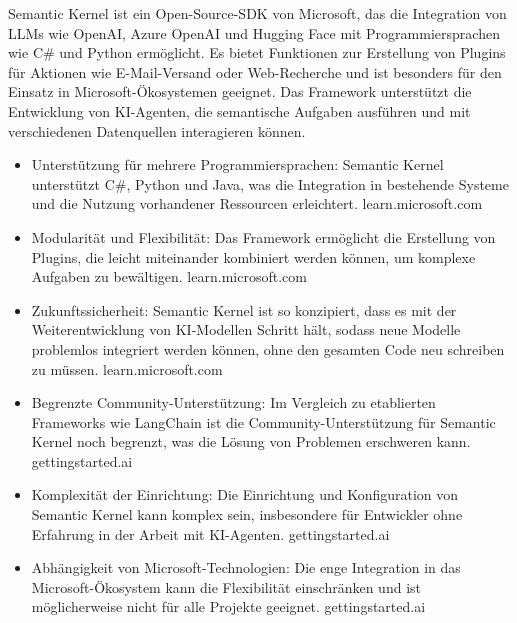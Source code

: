 Semantic Kernel ist ein Open-Source-SDK von Microsoft, das die Integration von LLMs wie OpenAI, Azure OpenAI und Hugging Face mit Programmiersprachen wie C\# und Python ermöglicht. Es bietet Funktionen zur Erstellung von Plugins für Aktionen wie E-Mail-Versand oder Web-Recherche und ist besonders für den Einsatz in Microsoft-Ökosystemen geeignet. Das Framework unterstützt die Entwicklung von KI-Agenten, die semantische Aufgaben ausführen und mit verschiedenen Datenquellen interagieren können.

\begin{itemize}
    \item Unterstützung für mehrere Programmiersprachen: Semantic Kernel unterstützt C\#, Python und Java, was die Integration in bestehende Systeme und die Nutzung vorhandener Ressourcen erleichtert.
    learn.microsoft.com

    \item Modularität und Flexibilität: Das Framework ermöglicht die Erstellung von Plugins, die leicht miteinander kombiniert werden können, um komplexe Aufgaben zu bewältigen.
    learn.microsoft.com

    \item Zukunftssicherheit: Semantic Kernel ist so konzipiert, dass es mit der Weiterentwicklung von KI-Modellen Schritt hält, sodass neue Modelle problemlos integriert werden können, ohne den gesamten Code neu schreiben zu müssen.
    learn.microsoft.com
\end{itemize}

\begin{itemize}
    \item Begrenzte Community-Unterstützung: Im Vergleich zu etablierten Frameworks wie LangChain ist die Community-Unterstützung für Semantic Kernel noch begrenzt, was die Lösung von Problemen erschweren kann.
    gettingstarted.ai

    \item Komplexität der Einrichtung: Die Einrichtung und Konfiguration von Semantic Kernel kann komplex sein, insbesondere für Entwickler ohne Erfahrung in der Arbeit mit KI-Agenten.
    gettingstarted.ai

    \item Abhängigkeit von Microsoft-Technologien: Die enge Integration in das Microsoft-Ökosystem kann die Flexibilität einschränken und ist möglicherweise nicht für alle Projekte geeignet.
    gettingstarted.ai
\end{itemize}


